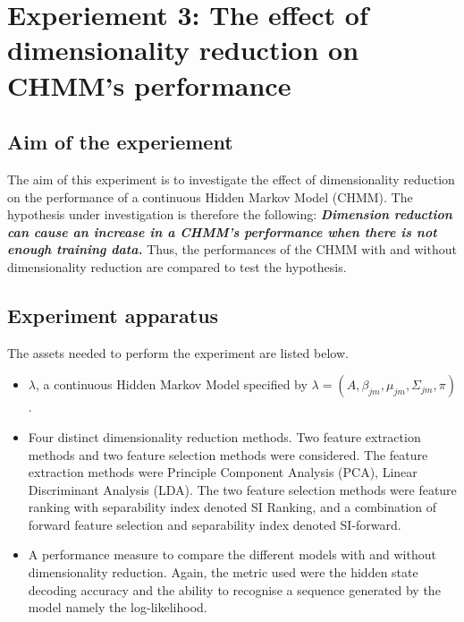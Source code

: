 \section{Experiement 3: The effect of dimensionality reduction on CHMM's performance}  \label{exp:dim}

\subsection{Aim of the experiement}
The aim of this experiment is to investigate the effect of dimensionality reduction on the performance of a continuous Hidden Markov Model (CHMM).
The hypothesis under investigation is therefore the following:
\textbf{\textit{Dimension reduction can cause an increase in a CHMM's performance when there is not enough training data.}}
Thus, the performances of the CHMM with and without dimensionality reduction are compared to test the hypothesis.

\subsection{Experiment apparatus}
The assets needed to perform the experiment are listed below.
\begin{itemize}
	\item \(\lambda\), a continuous Hidden Markov Model specified by \(\lambda = (A, \beta_{jm}, \mu_{jm}, \Sigma_{jm}, \pi)\).
	\item Four distinct dimensionality reduction methods. Two feature extraction methods and two feature selection methods were considered. The feature extraction methods were Principle Component Analysis (PCA), Linear Discriminant Analysis (LDA). The two feature selection methods were feature ranking with separability index denoted SI Ranking, and a combination of forward feature selection and separability index denoted SI-forward.
	\item A performance measure to compare the different models with and without dimensionality reduction. Again, the metric used were the hidden state decoding accuracy and the ability to recognise a sequence generated by the model namely the log-likelihood.
\end{itemize}

